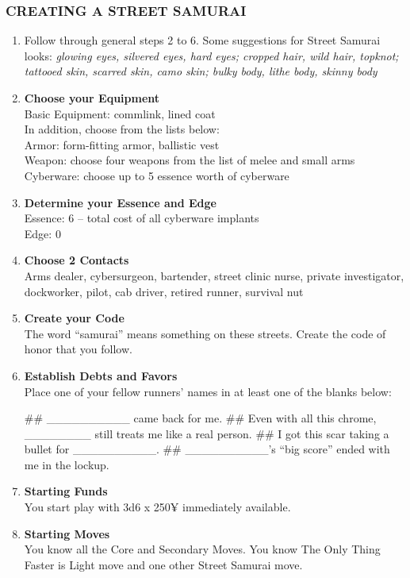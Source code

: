 \subsubsection{CREATING A STREET SAMURAI}
\begin{enumerate}
    \item Follow through general steps 2 to 6. Some suggestions for Street Samurai looks: \textit{glowing eyes, silvered eyes, hard eyes; cropped hair, wild hair, topknot; tattooed skin, scarred skin, camo skin; bulky body, lithe body, skinny body}
    
    \item \textbf{Choose your Equipment} \\
    Basic Equipment: commlink, lined coat \\
    In addition, choose from the lists below: \\
    Armor: form-fitting armor, ballistic vest \\
    Weapon: choose four weapons from the list of melee and small arms \\
    Cyberware: choose up to 5 essence worth of cyberware
    
    \item \textbf{Determine your Essence and Edge} \\
    Essence: 6 – total cost of all cyberware implants \\
    Edge: 0
    
    \item \textbf{Choose 2 Contacts} \\
    Arms dealer, cybersurgeon, bartender, street clinic nurse, private investigator, dockworker, pilot, cab driver, retired runner, survival nut
    
    \item \textbf{Create your Code} \\
    The word “samurai” means something on these streets. Create the code of honor that you follow.
    
    \item \textbf{Establish Debts and Favors} \\
    Place one of your fellow runners’ names in at least one of the blanks below:
        \begin{easylist}
            ## \_\_\_\_\_\_\_\_\_\_ came back for me.
            ## Even with all this chrome, \_\_\_\_\_\_\_\_ still treats me like a real person.
            ## I got this scar taking a bullet for \_\_\_\_\_\_\_\_\_\_.
            ## \_\_\_\_\_\_\_\_\_\_’s “big score” ended with me in the lockup.
        \end{easylist}            
    
    \item \textbf{Starting Funds} \\
    You start play with 3d6 x 250¥ immediately available.
    
    \item \textbf{Starting Moves} \\
    You know all the Core and Secondary Moves. You know The Only Thing Faster is Light move and one other Street Samurai move.
\end{enumerate}

